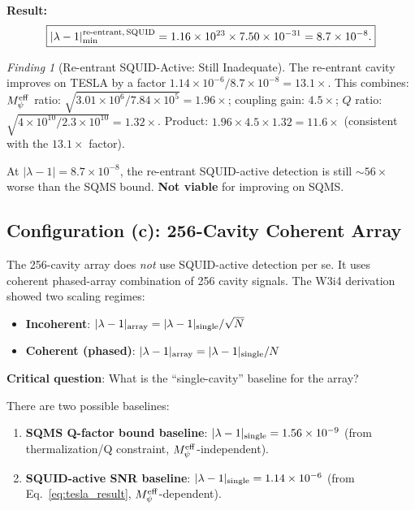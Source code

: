 \documentclass[11pt]{article}
\theoremstyle{definition}
\theoremstyle{remark}
\newtheorem{finding}[theorem]{Finding}
\newcommand{\lam}{\lambda}
\newcommand{\Meff}{M_\psi^{\rm eff}}
\newcommand{\ee}[1]{\times 10^{#1}}
\begin{document}
\textbf{Result:}
\begin{equation}
\boxed{
|\lam-1|_{\rm min}^{\rm re\text{-}entrant,\,SQUID} = 1.16\ee{23}\times7.50\ee{-31}
= 8.7\ee{-8}.
}
\label{eq:reentrant_result}
\end{equation}

\begin{finding}[Re-entrant SQUID-Active: Still Inadequate]
\label{find:reentrant_inadequate}
The re-entrant cavity improves on TESLA by a factor
$1.14\ee{-6}/8.7\ee{-8} = 13.1\times$. This combines:
$\Meff$ ratio: $\sqrt{3.01\ee{6}/7.84\ee{5}} = 1.96\times$;
coupling gain: $4.5\times$; $Q$ ratio: $\sqrt{4\ee{10}/2.3\ee{10}} = 1.32\times$.
Product: $1.96\times4.5\times1.32 = 11.6\times$ (consistent with the
$13.1\times$ factor).

At $|\lam-1| = 8.7\ee{-8}$, the re-entrant SQUID-active detection is
still $\sim 56\times$ worse than the SQMS bound. \textbf{Not viable}
for improving on SQMS.
\end{finding}

\subsection{Configuration (c): 256-Cavity Coherent Array}
\label{sec:256_array}

The 256-cavity array does \emph{not} use SQUID-active detection per se.
It uses coherent phased-array combination of 256 cavity signals. The
W3i4 derivation showed two scaling regimes:

\begin{itemize}[nosep]
\item \textbf{Incoherent}: $|\lam-1|_{\rm array} = |\lam-1|_{\rm single}/
  \sqrt{N}$
\item \textbf{Coherent (phased)}: $|\lam-1|_{\rm array} = |\lam-1|_{\rm single}/N$
\end{itemize}

\textbf{Critical question}: What is the ``single-cavity'' baseline for
the array?

There are two possible baselines:
\begin{enumerate}
\item \textbf{SQMS Q-factor bound baseline}: $|\lam-1|_{\rm single} =
  1.56\ee{-9}$ (from thermalization/Q constraint, $\Meff$-independent).
\item \textbf{SQUID-active SNR baseline}: $|\lam-1|_{\rm single} =
  1.14\ee{-6}$ (from Eq.~\eqref{eq:tesla_result}, $\Meff$-dependent).
\end{enumerate}
\end{document}
